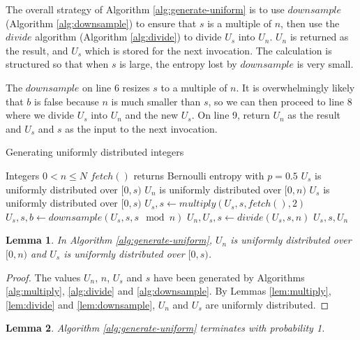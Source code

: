 \documentclass[12pt]{article}
\newtheorem{lemma}{Lemma}
\begin{document}
The overall strategy of Algorithm \ref{alg:generate-uniform} is to use $downsample$ (Algorithm \ref{alg:downsample}) to ensure that $s$ is a multiple of $n$, then use the $divide$ algorithm (Algorithm \ref{alg:divide}) to divide $U_s$ into $U_n$. $U_n$ is returned as the result, and $U_s$ which is stored for the next invocation. The calculation is structured so that when $s$ is large, the entropy lost by $downsample$ is very small.

The $downsample$ on line 6 resizes $s$ to a multiple of $n$. It is overwhelmingly likely that $b$ is false because $n$ is much smaller than $s$, so we can then proceed to line 8 where we divide $U_s$ into $U_n$ and the new $U_s$. On line 9, return $U_n$ as the result and $U_s$ and $s$ as the input to the next invocation.

\begin{algorithm}
\caption{Generating uniformly distributed integers}
\label{alg:generate-uniform}
\begin{algorithmic}[1]
\Require Integers $0 < n\le N$
\Require $fetch()$ returns Bernoulli entropy with $p=0.5$
\Require $U_s$ is uniformly distributed over $[0,s)$
\Ensure $U_n$ is uniformly distributed over $[0,n)$
\Ensure $U_s$ is uniformly distributed over $[0,s)$
        \State $U_s, s \gets multiply(U_s, s, fetch(), 2)$
    \EndWhile
    \State $U_s, s, b \gets downsample(U_s, s, s \mod n)$ 
        \State $U_n, U_s, s \gets divide(U_s, s, n)$
        \State \Return $U_s, s, U_n$
    \EndIf
  \EndWhile
\EndProcedure
\end{algorithmic}
\end{algorithm}

\begin{lemma}
    In Algorithm \ref{alg:generate-uniform}, 
$U_n$ is uniformly distributed over $[0,n)$ and 
$U_s$ is uniformly distributed over $[0,s)$.
\end{lemma}

\begin{proof}
The values $U_n$, $n$, $U_s$ and $s$ have been generated by Algorithms \ref{alg:multiply}, \ref{alg:divide} and \ref{alg:downsample}. By Lemmas \ref{lem:multiply}, \ref{lem:divide} and \ref{lem:downsample}, $U_n$ and $U_s$ are uniformly distributed.
\end{proof}

\begin{lemma}
Algorithm \ref{alg:generate-uniform} terminates with probability 1.
\end{lemma}
\end{document}
